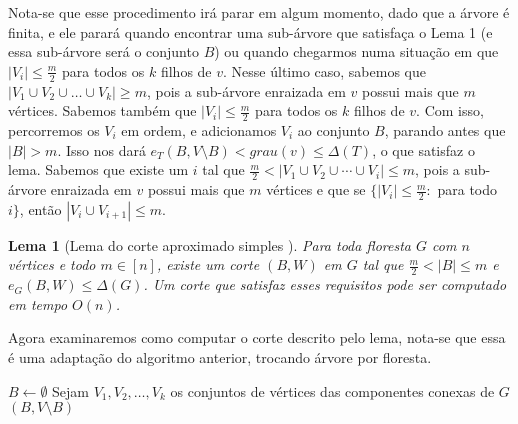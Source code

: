 \documentclass[a4paper,12pt]{article}
\newtheorem{lem}{Lema}
\begin{document}
	Nota-se que esse procedimento irá parar em algum momento, dado que a árvore 
	é finita, e ele parará quando encontrar
	uma sub-árvore que satisfaça o Lema 1 (e essa sub-árvore será o conjunto $B$) 
	ou quando chegarmos numa situação em que  
	$|V_i|\le \frac{m}{2}$ para todos os $k$ filhos de $v$.
	Nesse último caso, sabemos que $|V_1\cup V_2\cup \ldots \cup V_k|\ge m$, pois
	a sub-árvore enraizada em $v$ possui mais que $m$ vértices. 
	Sabemos também que $|V_i|\le \frac{m}{2}$ para todos os $k$ filhos de $v$. 
	Com isso, percorremos os $V_i$ em ordem, e 
	adicionamos $V_i$ ao conjunto $B$, parando antes que $|B| > m$. Isso nos dará
	$e_T(B,V\setminus B) < grau(v) \le \Delta(T)$, o que satisfaz o lema.
	Sabemos que existe um $i$ tal que 
	$\frac{m}{2} < |V_1 \cup V_2 \cup \cdots \cup V_i| \le m$, pois a sub-árvore
	enraizada em $v$ possui mais que $m$ vértices e que se 
	$\{|V_i|\le \frac{m}{2}:$ para todo $i\}$,
	então $|V_i \cup V_{i+1}| \le m$.


\bigskip
\bigskip
\bigskip
\bigskip
\bigskip
\bigskip
\bigskip
\bigskip

\begin{lem}[Lema do corte aproximado simples {\cite[Lemma 2]{Schmidt15}}]

	Para toda floresta $G$ com $n$ vértices e todo $m \in [n]$,
	existe um corte $(B,W)$ em $G$ tal que 
	$\frac{m}{2} <|B| \le m$ e
	$e_G(B,W) \le \Delta(G)$.
	Um corte que satisfaz esses requisitos pode ser computado em
	tempo $O(n)$.
\end{lem}

\medskip

Agora examinaremos como computar o corte descrito pelo lema,
nota-se que essa é uma adaptação do algoritmo anterior, 
trocando árvore por floresta.

\medskip
\medskip

\begin{algorithm}[H]

	\caption{Computa corte aproximado simples em uma floresta}
	$B \gets \emptyset$\;
	Sejam $V_1, V_2,\ldots, V_k$ os conjuntos de vértices das
	componentes conexas de $G$\;
	\Return $(B,V\setminus B)$\;

\end{algorithm}	
\end{document}
